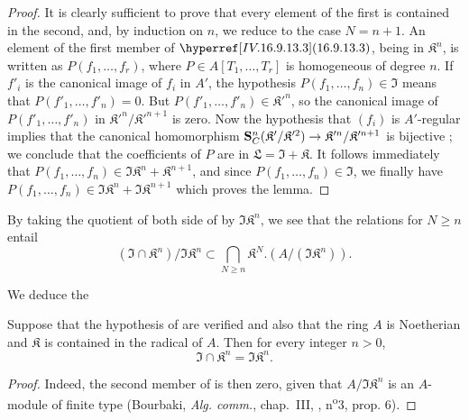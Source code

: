 \begin{proof}
It is clearly sufficient to prove that every element of the first is contained in the second, and, by induction on $n$, we reduce to the case $N = n + 1$.
An element of the first member of $\sref{IV.16.9.13.3}$, being in $\mathfrak{K}^n$, is written as $P(f_1, \dots, f_r)$, where $P \in A[T_1, \dots, T_r]$ is homogeneous of degree $n$.
If $f'_i$ is the canonical image of $f_i$ in $A'$, the hypothesis $P(f_1, \dots, f_n) \in \mathfrak{I}$ means that $P(f'_1, \dots, f'_n) = 0$.
But $P(f'_1, \dots, f'_n) \in \mathfrak{K}'^n$, so the canonical image of $P(f'_1, \dots, f'_n)$ in $\mathfrak{K}'^n/\mathfrak{K}'^{n+1}$ is zero.
Now the hypothesis that $(f_i)$ is $A'$-regular implies that the canonical homomorphism $\bb{S}_C^n(\mathfrak{K}'/\mathfrak{K}'^2) \to \mathfrak{K}'^n/\mathfrak{K}'^{n+1}$ is bijective ;
we conclude that the coefficients of $P$ are in $\mathfrak{L} = \mathfrak{I} + \mathfrak{K}$.
It follows immediately that $P(f_1, \dots, f_n) \in \mathfrak{I}\mathfrak{K}^n + \mathfrak{K}^{n+1}$, and since $P(f_1, \dots, f_n) \in \mathfrak{I}$, we finally have $P(f_1, \dots, f_n) \in \mathfrak{I}\mathfrak{K}^n + \mathfrak{I}\mathfrak{K}^{n+1}$ which proves the lemma.
\end{proof}

By taking the quotient of both side of  by $\mathfrak{I}\mathfrak{K}^{n}$, we see that the relations  for $N \geq n$ entail
\[
  \label{IV.16.9.13.4}
  (\mathfrak{I} \cap \mathfrak{K}^n)/\mathfrak{I}\mathfrak{K}^n \subset \bigcap_{N \geq n} \mathfrak{K}^N .(A/(\mathfrak{I}\mathfrak{K}^n)).  
  \tag{16.9.13.4}
\]

We deduce the

\begin{corollary}[16.9.13.5]
\label{IV.16.9.13.5}
Suppose that the hypothesis of  are verified and also that the ring $A$ is Noetherian and $\mathfrak{K}$ is contained in the radical of $A$.
Then for every integer $n > 0$,
\[
  \label{IV.16.9.13.6}
  \mathfrak{I} \cap \mathfrak{K}^n = \mathfrak{I}\mathfrak{K}^n.
  \tag{16.9.13.6}
\]
\end{corollary}

\begin{proof}
Indeed, the second member of  is then zero, given that $A/\mathfrak{I}\mathfrak{K}^n$ is an $A$-module of finite type (Bourbaki, \emph{Alg. comm.}, chap.~III, , n\textsuperscript{o}3, prop. 6).
\end{proof}

